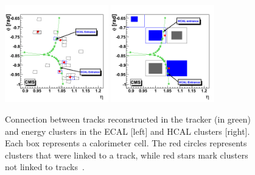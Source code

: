 \begin{figure}[!Hhtbp]
  \begin{center}
    \includegraphics[width=0.4\textwidth]{figs/Conection_tracks_Ecalcluster.png}
    \includegraphics[width=0.4\textwidth]{figs/Conection_tracks_Hcalcluster.png}
    \caption{Connection between tracks reconstructed in the tracker (in green) and energy clusters in the ECAL [left] and HCAL clusters [right]. Each box represents a calorimeter cell. The red circles represents clusters that were linked to a track, while red stars mark clusters not linked to tracks~\cite{Brochet:1956723}.}
    \label{fig:SubdetConec}
  \end{center}
\end{figure}
%
%
